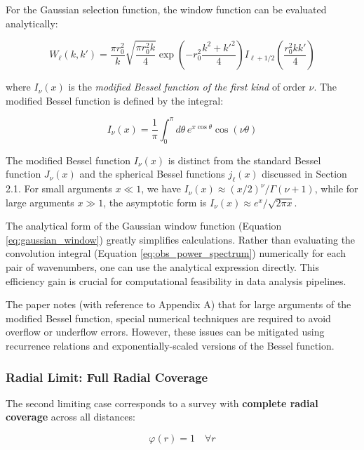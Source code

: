 For the Gaussian selection function, the window function can be evaluated analytically:

\begin{equation}
W_\ell(k, k') = \frac{\pi r_0^2}{k} \sqrt{\frac{\pi r_0^2 k}{4}} \exp\left( -r_0^2 \frac{k^2 + k'^2}{4} \right) I_{\ell + 1/2}\left( \frac{r_0^2 kk'}{4} \right)
\label{eq:gaussian_window}
\end{equation}

where $I_\nu(x)$ is the \emph{modified Bessel function of the first kind} of order $\nu$. The modified Bessel function is defined by the integral:

\begin{equation}
I_\nu(x) = \frac{1}{\pi} \int_0^\pi d\theta \, e^{x \cos\theta} \cos(\nu\theta)
\label{eq:modified_bessel_def}
\end{equation}

The modified Bessel function $I_\nu(x)$ is distinct from the standard Bessel function $J_\nu(x)$ and the spherical Bessel functions $j_\ell(x)$ discussed in Section 2.1. For small arguments $x \ll 1$, we have $I_\nu(x) \approx (x/2)^\nu / \Gamma(\nu+1)$, while for large arguments $x \gg 1$, the asymptotic form is $I_\nu(x) \approx e^x / \sqrt{2\pi x}$.

The analytical form of the Gaussian window function (Equation \ref{eq:gaussian_window}) greatly simplifies calculations. Rather than evaluating the convolution integral (Equation \ref{eq:obs_power_spectrum}) numerically for each pair of wavenumbers, one can use the analytical expression directly. This efficiency gain is crucial for computational feasibility in data analysis pipelines.

The paper notes (with reference to Appendix A) that for large arguments of the modified Bessel function, special numerical techniques are required to avoid overflow or underflow errors. However, these issues can be mitigated using recurrence relations and exponentially-scaled versions of the Bessel function.

\subsubsection{Radial Limit: Full Radial Coverage}

The second limiting case corresponds to a survey with \textbf{complete radial coverage} across all distances:

\begin{equation}
\varphi(r) = 1 \quad \forall r
\label{eq:full_radial_coverage}
\end{equation}

